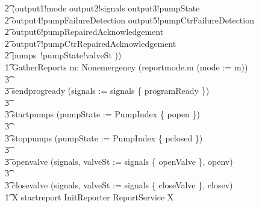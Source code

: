 \documentclass{report} %
\begin{document}
\begin{circus}
            \t2 (output1!mode \then output2!signals \then output3!pumpState \then \\
            \t2 output4!pumpFailureDetection \then output5!pumpCtrFailureDetection \then \\
            \t2 output6!pumpRepairedAcknowledgement \then \\
            \t2 output7!pumpCtrRepairedAcknowledgement \then \\
            \t2 pumps~!pumpState!valveSt \then \Skip)) \\ %
        \t1 GatherReports \circdef \Extchoice m: Nonemergency \circspot (reportmode.m \then (mode := m))
                    \\ %
                    \t3 \extchoice
                    \\ %
                    \t3 sendprogready \then (signals := signals \cup \{ programReady \})
                    \\ %
                    \t3 \extchoice
                    \\ %
                    \t3 startpumps \then (pumpState := PumpIndex \cross \{ popen \})
                    \\ %
                    \t3 \extchoice
                    \\ %
                    \t3 stoppumps \then (pumpState := PumpIndex \cross \{ pclosed \})
                    \\ %
                    \t3 \extchoice
                    \\ %
                    \t3 openvalve \then (signals, valveSt := signals \cup \{ openValve \}, openv)
                    \\ %
                    \t3 \extchoice
                    \\ %
                    \t3 closevalve \then (signals, valveSt := signals \cup \{ closeValve \}, closev) \\
        \t1 \circspot \circmu X \circspot startreport \then \lschexpract InitReporter \rschexpract \circseq ReportService \circseq X \\
        \circend
\end{circus}
\end{document}
